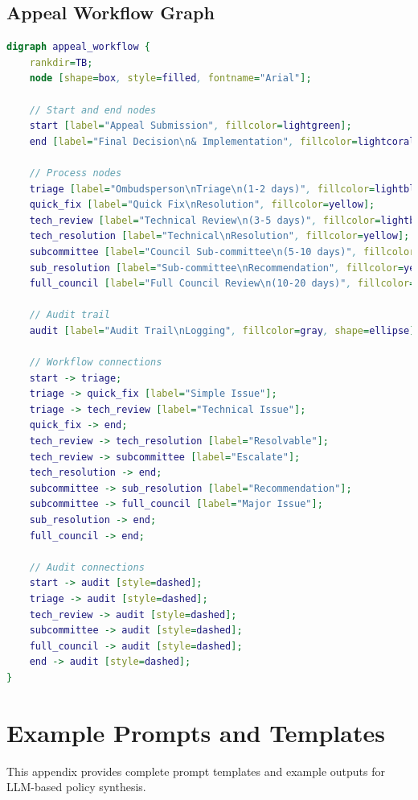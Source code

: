 \documentclass[sigconf,natbib]{acmart}
\begin{document}
\subsection{Appeal Workflow Graph}
\label{lst:appeal_workflow_dot_appendix}
\begin{lstlisting}[language=DOT, caption=Complete Appeal Workflow DOT Code]
digraph appeal_workflow {
    rankdir=TB;
    node [shape=box, style=filled, fontname="Arial"];

    // Start and end nodes
    start [label="Appeal Submission", fillcolor=lightgreen];
    end [label="Final Decision\n& Implementation", fillcolor=lightcoral];

    // Process nodes
    triage [label="Ombudsperson\nTriage\n(1-2 days)", fillcolor=lightblue];
    quick_fix [label="Quick Fix\nResolution", fillcolor=yellow];
    tech_review [label="Technical Review\n(3-5 days)", fillcolor=lightblue];
    tech_resolution [label="Technical\nResolution", fillcolor=yellow];
    subcommittee [label="Council Sub-committee\n(5-10 days)", fillcolor=orange];
    sub_resolution [label="Sub-committee\nRecommendation", fillcolor=yellow];
    full_council [label="Full Council Review\n(10-20 days)", fillcolor=red];

    // Audit trail
    audit [label="Audit Trail\nLogging", fillcolor=gray, shape=ellipse];

    // Workflow connections
    start -> triage;
    triage -> quick_fix [label="Simple Issue"];
    triage -> tech_review [label="Technical Issue"];
    quick_fix -> end;
    tech_review -> tech_resolution [label="Resolvable"];
    tech_review -> subcommittee [label="Escalate"];
    tech_resolution -> end;
    subcommittee -> sub_resolution [label="Recommendation"];
    subcommittee -> full_council [label="Major Issue"];
    sub_resolution -> end;
    full_council -> end;

    // Audit connections
    start -> audit [style=dashed];
    triage -> audit [style=dashed];
    tech_review -> audit [style=dashed];
    subcommittee -> audit [style=dashed];
    full_council -> audit [style=dashed];
    end -> audit [style=dashed];
}
\end{lstlisting}

\section{Example Prompts and Templates}
\label{app:example_prompts}

This appendix provides complete prompt templates and example outputs for LLM-based policy synthesis.
\end{document}
